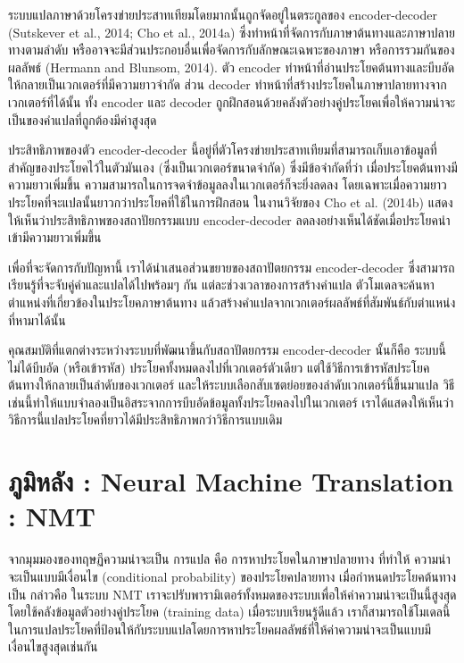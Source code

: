 \documentclass[17pt,fancychapters]{report}
\begin{document}
ระบบแปลภาษาด้วยโครงข่ายประสาทเทียมโดยมากนั้นถูกจัดอยู่ในตระกูลของ encoder-decoder  (Sutskever et al., 2014; Cho et al., 2014a) ซึ่งทำหน้าที่จัดการกับภาษาต้นทางและภาษาปลายทางตามลำดับ หรืออาจจะมีส่วนประกอบอื่นเพื่อจัดการกับลักษณะเฉพาะของภาษา หรือการรวมกันของผลลัพธ์ (Hermann and Blunsom, 2014). ตัว encoder ทำหน้าที่อ่านประโยคต้นทางและบีบอัดให้กลายเป็นเวกเตอร์ที่มีความยาวจำกัด ส่วน decoder ทำหน้าที่สร้างประโยคในภาษาปลายทางจากเวกเตอร์ที่ได้นั้น ทั้ง encoder และ decoder ถูกฝึกสอนด้วยคลังตัวอย่างคู่ประโยคเพื่อให้ความน่าจะเป็นของคำแปลที่ถูกต้องมีค่าสูงสุด

ประสิทธิภาพของตัว encoder-decoder นี้อยู่ที่ตัวโครงข่ายประสาทเทียมที่สามารถเก็บเอาข้อมูลที่สำคัญของประโยคไว้ในตัวมันเอง (ซึ่งเป็นเวกเตอร์ขนาดจำกัด) ซึ่งมีข้อจำกัดที่ว่า เมื่อประโยคต้นทางมีความยาวเพิ่มขึ้น ความสามารถในการจดจำข้อมูลลงในเวกเตอร์ก็จะยิ่งลดลง โดยเฉพาะเมื่อความยาวประโยคที่จะแปลนั้นยาวกว่าประโยคที่ใช้ในการฝึกสอน ในงานวิจัยของ Cho et al. (2014b) แสดงให้เห็นว่าประสิทธิภาพของสถาปัยกรรมแบบ encoder-decoder ลดลงอย่างเห็นได้ชัดเมื่อประโยคนำเข้ามีความยาวเพิ่มขึ้น

เพื่อที่จะจัดการกับปัญหานี้ เราได้นำเสนอส่วนขยายของสถาปัตยกรรม encoder-decoder ซึ่งสามารถเรียนรู้ที่จะจับคู่คำและแปลได้ไปพร้อมๆ กัน แต่ละช่วงเวลาของการสร้างคำแปล ตัวโมเดลจะค้นหาตำแหน่งที่เกี่ยวข้องในประโยคภาษาต้นทาง แล้วสร้างคำแปลจากเวกเตอร์ผลลัพธ์ที่สัมพันธ์กับตำแหน่งที่หามาได้นั้น

คุณสมบัติที่แตกต่างระหว่างระบบที่พัฒนาขึ้นกับสถาปัตยกรรม encoder-decoder นั้นก็คือ ระบบนี้ไม่ได้บีบอัด (หรือเข้ารหัส) ประโยคทั้งหมดลงไปที่เวกเตอร์ตัวเดียว แต่ใช้วิธีการเข้ารหัสประโยคต้นทางให้กลายเป็นลำดับของเวกเตอร์ และให้ระบบเลือกสับเซตย่อยของลำดับเวกเตอร์นี้ขึ้นมาแปล วิธีเช่นนี้ทำให้แบบจำลองเป็นอิสระจากการบีบอัดข้อมูลทั้งประโยคลงไปในเวกเตอร์ เราได้แสดงให้เห็นว่าวิธีการนี้แปลประโยคที่ยาวได้มีประสิทธิภาพกว่าวิธีการแบบเดิม

\section{ภูมิหลัง : Neural Machine Translation : NMT}

จากมุมมองของทฤษฏีความน่าจะเป็น การแปล คือ การหาประโยคในภาษาปลายทาง   ที่ทำให้ ความน่าจะเป็นแบบมีเงื่อนไข (conditional probability) ของประโยคปลายทาง  เมื่อกำหนดประโยคต้นทางเป็น  กล่าวคือ 
 ในระบบ NMT เราจะปรับพารามิเตอร์ทั้งหมดของระบบเพื่อให้ค่าความน่าจะเป็นนี้สูงสุดโดยใช้คลังข้อมูลตัวอย่างคู่ประโยค (training data) เมื่อระบบเรียนรู้ดีแล้ว เราก็สามารถใช้โมเดลนี้ในการแปลประโยคที่ป้อนให้กับระบบแปลโดยการหาประโยคผลลัพธ์ที่ให้ค่าความน่าจะเป็นแบบมีเงื่อนไขสูงสุดเช่นกัน
\end{document}
